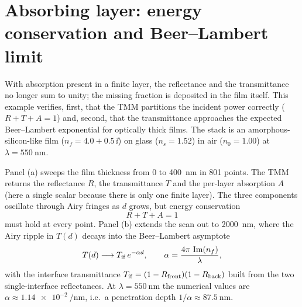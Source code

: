 \section{Absorbing layer: energy conservation and Beer--Lambert limit}

With absorption present in a finite layer, the reflectance and the
transmittance no longer sum to unity; the missing fraction is deposited in
the film itself. This example verifies, first, that the TMM partitions the
incident power correctly ($R + T + A = 1$) and, second, that the
transmittance approaches the expected Beer--Lambert exponential for
optically thick films. The stack is an amorphous-silicon-like film
($n_f = 4.0 + 0.5\,\ii$) on glass ($n_s = 1.52$) in air ($n_0 = 1.00$) at
$\lambda = \SI{550}{\nano\metre}$.

Panel (a) sweeps the film thickness from $0$ to \SI{400}{\nano\metre} in
801 points. The TMM returns the reflectance $R$, the transmittance $T$ and
the per-layer absorption $A$ (here a single scalar because there is only
one finite layer). The three components oscillate through Airy fringes as
$d$ grows, but energy conservation
\begin{equation}
  R + T + A = 1 \label{eq:abs-rta}
\end{equation}
must hold at every point. Panel (b) extends the scan out to
\SI{2000}{\nano\metre}, where the Airy ripple in $T(d)$ decays into the
Beer--Lambert asymptote
\begin{equation}
  T(d) \longrightarrow T_{\rm if}\,e^{-\alpha d},\qquad \alpha = \frac{4\pi\,\operatorname{Im}(n_f)}{\lambda}, \label{eq:abs-BL}
\end{equation}
with the interface transmittance
$T_{\rm if} = (1 - R_{\rm front})(1 - R_{\rm back})$ built from the two
single-interface reflectances. At $\lambda = \SI{550}{\nano\metre}$ the
numerical values are $\alpha \approx \SI{1.14e-2}{\per\nano\metre}$, i.e.\
a penetration depth $1/\alpha \approx \SI{87.5}{\nano\metre}$.

\begin{center}
\end{center}

